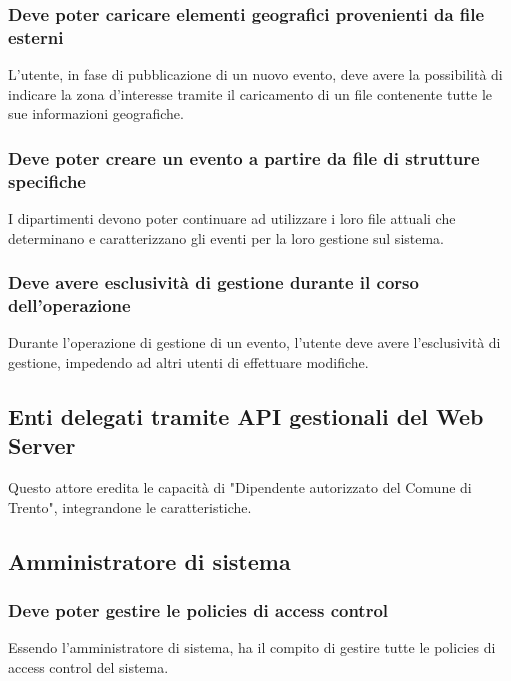 \documentclass{article}
\begin{document}
\subsubsection{Deve poter caricare elementi geografici provenienti da file esterni}
\label{5.3.8}
L'utente, in fase di pubblicazione di un nuovo evento, deve avere la possibilità di indicare la zona d'interesse tramite il caricamento di un file contenente tutte le sue informazioni geografiche.

\subsubsection{Deve poter creare un evento a partire da file di strutture specifiche}
\label{5.3.9}
I dipartimenti devono poter continuare ad utilizzare i loro file attuali che determinano e caratterizzano gli eventi per la loro gestione sul sistema.

\subsubsection{Deve avere esclusività di gestione durante il corso dell'operazione}
\label{5.3.10}
Durante l'operazione di gestione di un evento, l'utente deve avere l'esclusività di gestione, impedendo ad altri utenti di effettuare modifiche.

\subsection{Enti delegati tramite API gestionali del Web Server}
Questo attore eredita le capacità di "Dipendente autorizzato del Comune di Trento", integrandone le caratteristiche.

\subsection{Amministratore di sistema}
\label{5.4.1}

\subsubsection{Deve poter gestire le policies di access control}
\label{5.5.1}
Essendo l'amministratore di sistema, ha il compito di gestire tutte le policies di access control del sistema.
\end{document}
